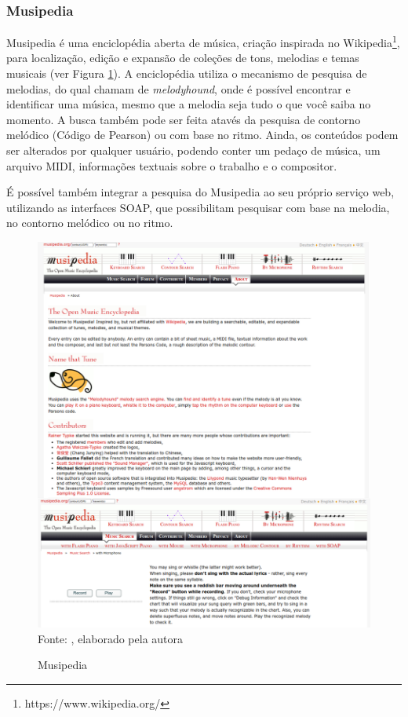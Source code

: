 \subsubsection{Musipedia} \label{subsec:musipedia}
Musipedia é uma enciclopédia aberta de música, criação inspirada no Wikipedia\footnote{https://www.wikipedia.org/}, para localização, edição e expansão de coleções de tons, melodias e temas musicais (ver Figura \ref{fig:musipedia}). A enciclopédia utiliza o mecanismo de pesquisa de melodias, do qual chamam de \textit{melodyhound}, onde é possível encontrar e identificar uma música, mesmo que a melodia seja tudo o que você saiba no momento. A busca também pode ser feita atavés da pesquisa de contorno melódico (Código de Pearson) ou com base no ritmo. Ainda, os conteúdos podem ser alterados por qualquer usuário, podendo conter um pedaço de música, um arquivo MIDI, informações textuais sobre o trabalho e o compositor.

É possível também integrar a pesquisa do Musipedia ao seu próprio serviço web, utilizando as interfaces SOAP, que possibilitam pesquisar com base na melodia, no contorno melódico ou no ritmo.

\begin{figure}[!htb]
   \centering
   \caption{Musipedia}\label{fig:musipedia} 
   \includegraphics[scale=0.27]{figuras/musipedia.png}
   \\Fonte: \cite{musipedia}, elaborado pela autora
\end{figure}



